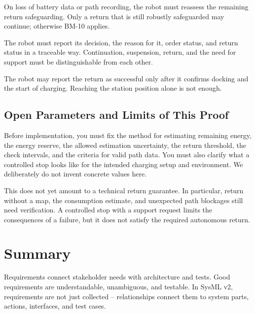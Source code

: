 \begin{description}[style=nextline]
    \item[BM-11: Data loss] On loss of battery data or path recording, the robot must reassess the remaining return safeguarding. Only a return that is still robustly safeguarded may continue; otherwise BM-10 applies.
    \item[BM-12: Traceable status] The robot must report its decision, the reason for it, order status, and return status in a traceable way. Continuation, suspension, return, and the need for support must be distinguishable from each other.
    \item[BM-13: Return successful] The robot may report the return as successful only after it confirms docking and the start of charging. Reaching the station position alone is not enough.
\end{description}

\subsection{Open Parameters and Limits of This Proof}
Before implementation, you must fix the method for estimating remaining energy, the energy reserve, the allowed estimation uncertainty, the return threshold, the check intervals, and the criteria for valid path data. You must also clarify what a controlled stop looks like for the intended charging setup and environment. We deliberately do not invent concrete values here.

This does not yet amount to a technical return guarantee. In particular, return without a map, the consumption estimate, and unexpected path blockages still need verification. A controlled stop with a support request limits the consequences of a failure, but it does not satisfy the required autonomous return.

\section{Summary}
Requirements connect stakeholder needs with architecture and tests. Good requirements are understandable, unambiguous, and testable. In SysML v2, requirements are not just collected -- relationships connect them to system parts, actions, interfaces, and test cases.

